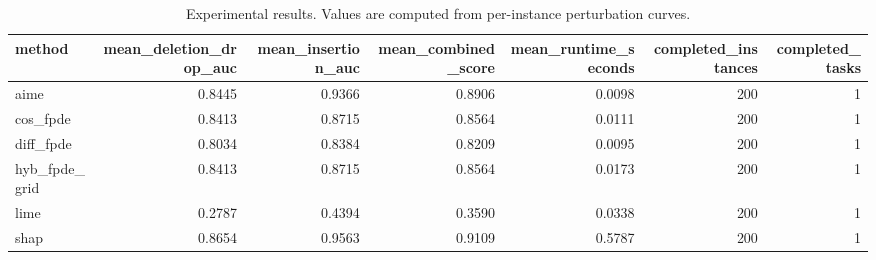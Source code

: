 \begin{table}[t]
\caption{Experimental results. Values are computed from per-instance perturbation curves.}
\label{tab:main_results_computed}
\centering
\begin{tabular}{lrrrrrr}
\toprule
method & mean\_deletion\_drop\_auc & mean\_insertion\_auc & mean\_combined\_score & mean\_runtime\_seconds & completed\_instances & completed\_tasks \\
\midrule
aime & 0.8445 & 0.9366 & 0.8906 & 0.0098 & 200 & 1 \\
cos\_fpde & 0.8413 & 0.8715 & 0.8564 & 0.0111 & 200 & 1 \\
diff\_fpde & 0.8034 & 0.8384 & 0.8209 & 0.0095 & 200 & 1 \\
hyb\_fpde\_grid & 0.8413 & 0.8715 & 0.8564 & 0.0173 & 200 & 1 \\
lime & 0.2787 & 0.4394 & 0.3590 & 0.0338 & 200 & 1 \\
shap & 0.8654 & 0.9563 & 0.9109 & 0.5787 & 200 & 1 \\
\bottomrule
\end{tabular}

\end{table}
